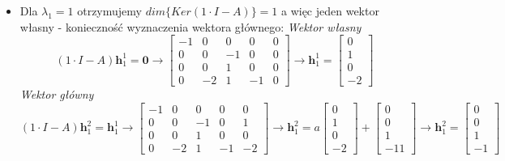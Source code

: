 \documentclass{article}
\begin{document}
\begin{itemize}
    \item Dla $\lambda_{1} = 1$ otrzymujemy $dim\{ Ker(1\cdot I-A)\} = 1$ a więc jeden wektor własny - konieczność wyznaczenia wektora głównego:
    \textit{Wektor własny}
    $$
        (1\cdot I-A)\mathbf{h}_{1}^{1} = \mathbf{0} \rightarrow
        \left[
        \begin{array}{cccc|c}
           -1 & 0 &  0 & 0 & 0\\
            0 & 0 & -1 & 0 & 0\\
            0 & 0 &  1 & 0 & 0\\
            0 &-2 &  1 &-1 & 0
        \end{array}
        \right]
        \rightarrow
        \mathbf{h}_{1}^{1}
        =
        \begin{bmatrix}
            0 \\ 1 \\ 0 \\ -2
        \end{bmatrix}
    $$
    \textit{Wektor główny}
    $$
        (1\cdot I-A)\mathbf{h}_{1}^{2} = \mathbf{h}_{1}^{1} \rightarrow
        \left[
        \begin{array}{cccc|c}
           -1 & 0 &  0 & 0 & 0\\
            0 & 0 & -1 & 0 & 1\\
            0 & 0 &  1 & 0 & 0\\
            0 &-2 &  1 &-1 &-2
        \end{array}
        \right]
        \rightarrow
        \mathbf{h}_{1}^{2}
        =
        a
        \begin{bmatrix}
            0 \\ 1 \\ 0 \\ -2
        \end{bmatrix}
        +
        \begin{bmatrix}
            0 \\ 0 \\ 1 \\ -11
        \end{bmatrix}
        \rightarrow
        \mathbf{h}_{1}^{2}
        =
        \begin{bmatrix}
            0 \\ 0 \\ 1 \\ -1
        \end{bmatrix}
    $$


\end{itemize}
\end{document}
